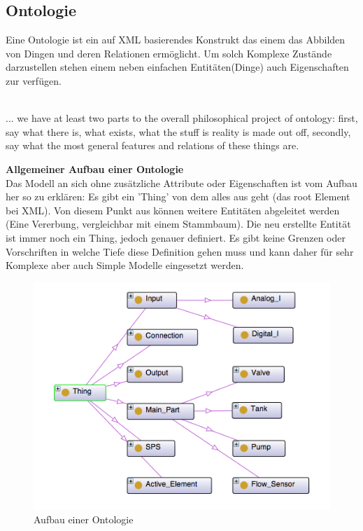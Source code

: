 \subsection{Ontologie}
Eine Ontologie ist ein auf XML basierendes Konstrukt das einem das Abbilden von Dingen und deren Relationen ermöglicht. Um solch Komplexe Zustände darzustellen stehen einem neben einfachen Entitäten(Dinge) auch Eigenschaften zur verfügen.\\
\\
\begin{displayquote}... we have at least two parts to the overall philosophical project of ontology: first, say what there is, what exists, what the stuff is reality is made out off, secondly, say what the most general features and relations of these things are.
\end{displayquote}
\textbf{Allgemeiner Aufbau einer Ontologie}\\
Das Modell an sich ohne zusätzliche Attribute oder Eigenschaften ist vom Aufbau her so zu erklären: Es gibt ein 'Thing' von dem alles aus geht (das root Element bei XML). Von diesem Punkt aus können weitere Entitäten abgeleitet werden (Eine Vererbung, vergleichbar mit einem Stammbaum). Die neu erstellte Entität ist immer noch ein Thing, jedoch genauer definiert. Es gibt keine Grenzen oder Vorschriften in welche Tiefe diese Definition gehen muss und kann daher für sehr Komplexe aber auch Simple Modelle eingesetzt werden.\\

\begin{figure}[hbt!]
 \centering
  \includegraphics[width=1\textwidth]{graphics/stateoftheart/Ontology_Aufbau}
  \caption{Aufbau einer Ontologie}
	\label{fig:Ontology_Aufbau}
\end{figure}

